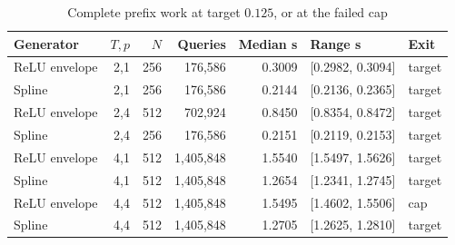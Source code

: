 \begin{table}[tbp]
\centering
\caption{Complete prefix work at target $0.125$, or at the failed cap}\label{tab:work45}
\begin{tabular}{lrrrrll}
\toprule
Generator & $T,p$ & $N$ & Queries & Median s & Range s & Exit \\
\midrule
ReLU envelope & 2,1 & 256 & 176,586 & 0.3009 & [0.2982, 0.3094] & target \\
Spline & 2,1 & 256 & 176,586 & 0.2144 & [0.2136, 0.2365] & target \\
ReLU envelope & 2,4 & 512 & 702,924 & 0.8450 & [0.8354, 0.8472] & target \\
Spline & 2,4 & 256 & 176,586 & 0.2151 & [0.2119, 0.2153] & target \\
ReLU envelope & 4,1 & 512 & 1,405,848 & 1.5540 & [1.5497, 1.5626] & target \\
Spline & 4,1 & 512 & 1,405,848 & 1.2654 & [1.2341, 1.2745] & target \\
ReLU envelope & 4,4 & 512 & 1,405,848 & 1.5495 & [1.4602, 1.5506] & cap \\
Spline & 4,4 & 512 & 1,405,848 & 1.2705 & [1.2625, 1.2810] & target \\
\bottomrule
\end{tabular}
\par{}
\end{table}
